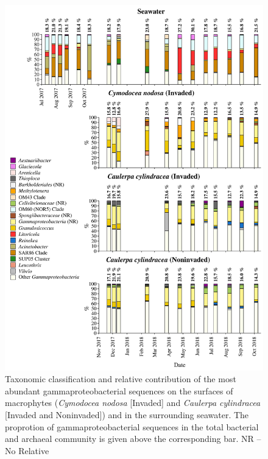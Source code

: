 \documentclass[12pt,]{article}
\begin{document}
\begin{figure}[H]

{\centering \includegraphics[width=0.85\linewidth]{../results/figures/gammaproteobacteria_bar_plot} 

}

\caption{Taxonomic classification and relative contribution of the most abundant gammaproteobacterial sequences on the surfaces of macrophytes (\textit{Cymodocea nodosa} [Invaded] and \textit{Caulerpa cylindracea} [Invaded and Noninvaded]) and in the surrounding seawater. The proprotion of gammaproteobacterial sequences in the total bacterial and archaeal community is given above the corresponding bar. NR -- No Relative\label{gamma}}\label{fig:unnamed-chunk-8}
\end{figure}
\end{document}

